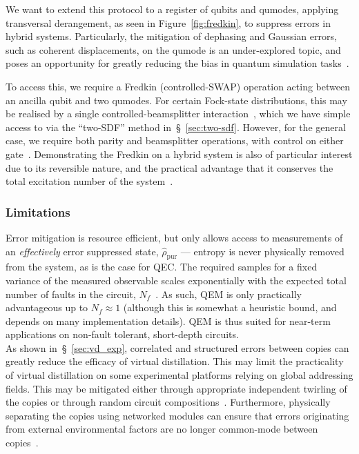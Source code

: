     We want to extend this protocol to a register of qubits and qumodes,
    applying transversal derangement, as seen in Figure~\ref{fig:fredkin}, to
    suppress errors in hybrid systems. Particularly, the mitigation of dephasing
    and Gaussian errors, such as coherent displacements, on the qumode is an under-explored topic, and poses an
    opportunity for greatly reducing the bias in quantum simulation
    tasks~\cite{varona_towards_2024}.

    To access this, we require a Fredkin (controlled-SWAP) operation acting
    between an ancilla qubit and two qumodes. For certain Fock-state
    distributions, this may be realised by a single controlled-beamsplitter
    interaction~\cite{gan_hybrid_2020}, which we have simple access to via the
    ``two-SDF'' method in~\S~\ref{sec:two-sdf}. However, for the general
    case, we require both parity and beamsplitter operations, with control on
    either gate~\cite{filip_overlap_2002}. Demonstrating the Fredkin on a hybrid
    system is also of particular interest due to its reversible nature, and 
    the practical advantage that it conserves the total
    excitation number of the system~\cite{fredkin_conservative_1982}.


\subsubsection{Limitations} 

    Error mitigation is resource efficient, but only allows access to
    measurements of an \emph{effectively} error suppressed state,
    $\hat\rho_\mathrm{pur}$ --- entropy is never physically removed from the
    system, as is the case for QEC. 
    The required samples for a fixed variance
    of the measured observable scales exponentially with the expected total
    number of faults in the circuit, $N_f$~\cite{cai_quantum_2023}.
    As such, QEM is only practically
    advantageous up to $N_f \approx 1$ (although this is somewhat a heuristic
    bound, and depends on many implementation details). QEM is thus suited for
    near-term applications on non-fault tolerant, short-depth circuits. \\

    As shown in~\S~\ref{sec:vd_exp}, correlated and structured errors between
    copies can greatly reduce the efficacy of virtual distillation. This may
    limit the practicality of virtual distillation on some experimental
    platforms relying on global addressing fields. This may be 
    mitigated either through appropriate independent twirling of the
    copies or through random circuit compositions~\cite{wallman_noise_2016}. Furthermore,
    physically separating the copies using networked modules can ensure that
    errors originating from external environmental factors are no longer
    common-mode between copies~\cite{araki_space-time_2025-1}. 


